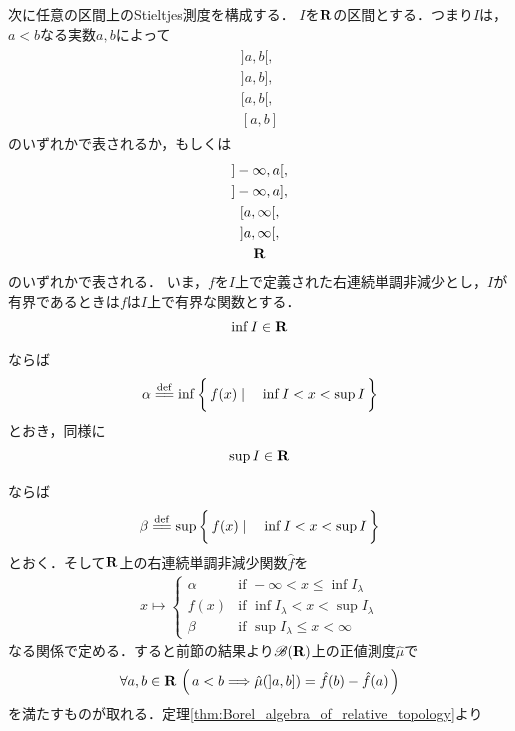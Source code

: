 	次に任意の区間上のStieltjes測度を構成する．
	$I$を$\mathbf{R}$の区間とする．つまり$I$は，$a < b$なる実数$a,b$によって
	\begin{align}
		\begin{gathered}
			]a,b[, \\
			]a,b],\\ 
			[a,b[,\\ 
			[a,b]
		\end{gathered}
	\end{align}
	のいずれかで表されるか，もしくは
	\begin{align}
		\begin{gathered}
			]-\infty,a[, \\
			]-\infty,a], \\
			[a,\infty[, \\
			]a,\infty[, \\
			\mathbf{R}
		\end{gathered}
	\end{align}
	のいずれかで表される．
	いま，$f$を$I$上で定義された右連続単調非減少とし，$I$が有界であるときは$f$は$I$上で有界な関数とする．
	\begin{align}
		\operatorname*{inf}_{} I \in \mathbf{R}
	\end{align}
	ならば
	\begin{align}
		\alpha \defeq \inf{}{\Set{f(x)}{\inf{}{I} < x < \sup{}{I}}}
	\end{align}
	とおき，同様に
	\begin{align}
		\operatorname*{sup}_{} I \in \mathbf{R}
	\end{align}
	ならば
	\begin{align}
		\beta \defeq \sup{}{\Set{f(x)}{\inf{}{I} < x < \sup{}{I}}}
	\end{align}
	とおく．そして$\mathbf{R}$上の右連続単調非減少関数$\hat{f}$を
	\begin{align}
		x \longmapsto 
		\begin{cases}
			\alpha & \mbox{if }-\infty < x \leq \inf{}{I_\lambda} \\
			f(x) & \mbox{if }\inf{}{I_\lambda} < x < \sup{}{I_\lambda} \\
			\beta & \mbox{if }\sup{}{I_\lambda} \leq x < \infty
		\end{cases}
	\end{align}
	なる関係で定める．すると前節の結果より$\mathscr{B}(\mathbf{R})$上の正値測度$\hat{\mu}$で
	\begin{align}
		\forall a,b \in \mathbf{R}\, \left(\, a < b \Longrightarrow \hat{\mu}(]a,b]) = \hat{f}(b) - \hat{f}(a)\, \right)
	\end{align}
	を満たすものが取れる．定理\ref{thm:Borel_algebra_of_relative_topology}より
